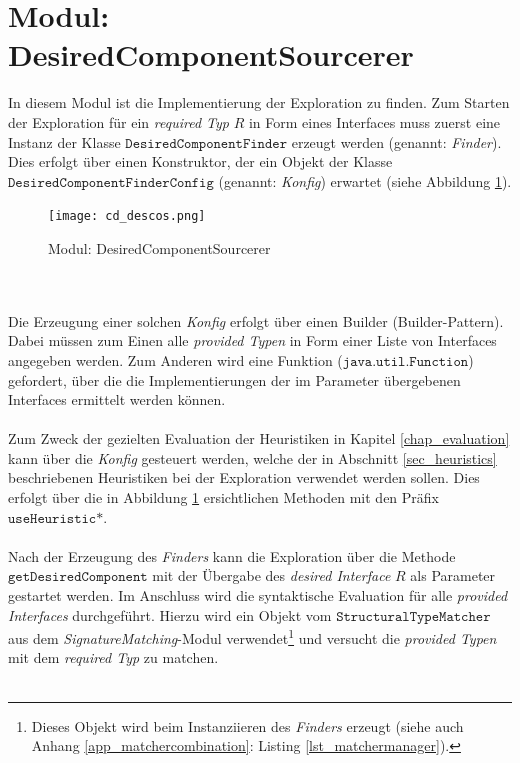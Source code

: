 \section{Modul: DesiredComponentSourcerer}\label{sec_impl_descos}
In diesem Modul ist die Implementierung der Exploration zu finden. Zum Starten der Exploration für ein \emph{required Typ} $R$ in Form eines \Gls{Interface}s muss zuerst eine Instanz der Klasse $\texttt{DesiredComponentFinder}$ erzeugt werden (genannt: \emph{Finder}). Dies erfolgt über einen Konstruktor, der ein Objekt der Klasse $\texttt{DesiredComponentFinderConfig}$ (genannt: \emph{Konfig}) erwartet (siehe Abbildung \ref{cd_descos}). 
\begin{figure}[h!]
\centering
\texttt{[image: cd\_descos.png]}
\caption{Modul: DesiredComponentSourcerer}
\label{cd_descos}
\end{figure}
\noindent
\\\\
Die Erzeugung einer solchen \emph{Konfig} erfolgt über einen Builder (Builder-Pattern). Dabei müssen zum Einen alle \emph{provided Typen} in Form einer Liste von \Gls{Interface}s angegeben werden. Zum Anderen wird eine Funktion ($\texttt{java.util.Function}$) gefordert, über die die Implementierungen der im Parameter übergebenen \Gls{Interface}s ermittelt werden können.
\\\\
Zum Zweck der gezielten Evaluation der Heuristiken in Kapitel \ref{chap_evaluation} kann über die \emph{Konfig} gesteuert werden, welche der in Abschnitt \ref{sec_heuristics} beschriebenen Heuristiken bei der Exploration verwendet werden sollen. Dies erfolgt über die in Abbildung \ref{cd_descos} ersichtlichen Methoden mit den Präfix $\texttt{useHeuristic*}$.
\\\\
Nach der Erzeugung des \emph{Finders} kann die Exploration über die Methode $\texttt{getDesiredComponent}$ mit der Übergabe des \emph{desired Interface} $R$ als Parameter gestartet werden. Im Anschluss wird die syntaktische Evaluation für alle \emph{provided Interfaces} durchgeführt. Hierzu wird ein Objekt vom $\texttt{StructuralTypeMatcher}$ aus dem \emph{SignatureMatching}-Modul verwendet\footnote{Dieses Objekt wird beim Instanziieren des \emph{Finders} erzeugt (siehe auch Anhang \ref{app_matchercombination}: Listing \ref{lst_matchermanager}).} und versucht die \emph{provided Typen} mit dem \emph{required Typ} zu matchen.
\\\\
